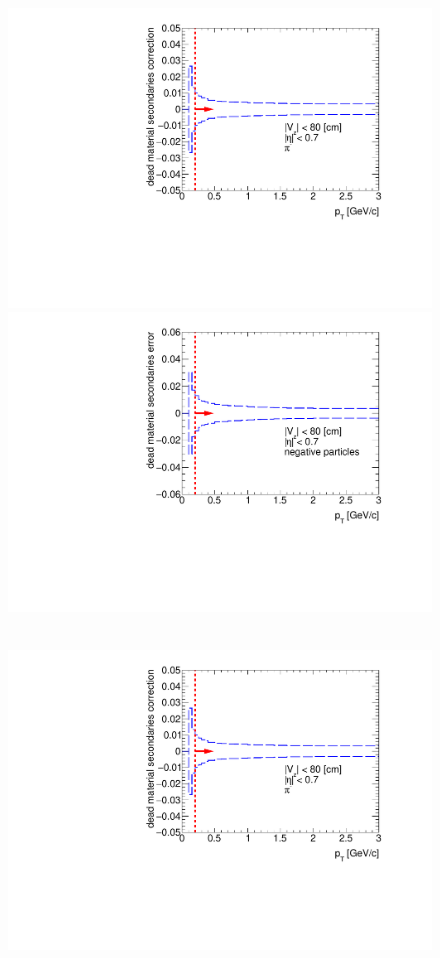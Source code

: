\begin{figure}[hb]
{  \includegraphics[width=\linewidth,page=3]{graphics/systematicsEfficiency/deadMaterial/secondaries_Unbinned_CD_1D.pdf}\\
  \includegraphics[width=\linewidth,page=1]{graphics/systematicsEfficiency/deadMaterial/secondaries_Unbinned_Charged_CD1D.pdf}\\
}~
\parbox{0.495\textwidth}{
  \centering
  \includegraphics[width=\linewidth,page=4]{graphics/systematicsEfficiency/deadMaterial/secondaries_Unbinned_CD_1D.pdf}\\
}
\end{figure}
